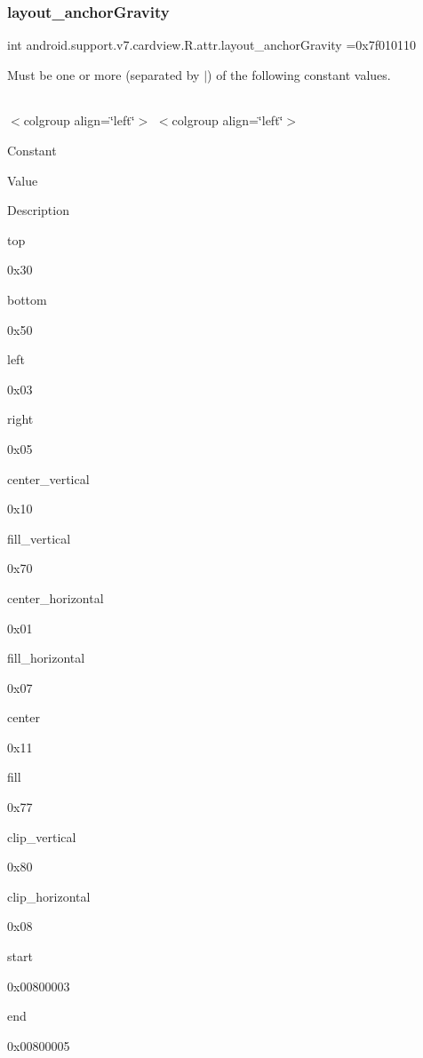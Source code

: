 \subsubsection{\texorpdfstring{layout\+\_\+anchor\+Gravity}{layout\_anchorGravity}}
{\footnotesize\ttfamily int android.\+support.\+v7.\+cardview.\+R.\+attr.\+layout\+\_\+anchor\+Gravity =0x7f010110\hspace{0.3cm}{\ttfamily [static]}}

Must be one or more (separated by \textquotesingle{}$\vert$\textquotesingle{}) of the following constant values.

\tabulinesep=1mm
\begin{longtabu} spread 0pt [c]{*{0}{|X[-1]}|}
\hline
\end{longtabu}
$<$colgroup align=\char`\"{}left\char`\"{}$>$ $<$colgroup align=\char`\"{}left\char`\"{}$>$ 

Constant

Value

Description 

{\ttfamily top}

0x30

{\ttfamily bottom}

0x50

{\ttfamily left}

0x03

{\ttfamily right}

0x05

{\ttfamily center\+\_\+vertical}

0x10

{\ttfamily fill\+\_\+vertical}

0x70

{\ttfamily center\+\_\+horizontal}

0x01

{\ttfamily fill\+\_\+horizontal}

0x07

{\ttfamily center}

0x11

{\ttfamily fill}

0x77

{\ttfamily clip\+\_\+vertical}

0x80

{\ttfamily clip\+\_\+horizontal}

0x08

{\ttfamily start}

0x00800003

{\ttfamily end}

0x00800005\mbox{\label{classandroid_1_1support_1_1v7_1_1cardview_1_1R_1_1attr_a407bbdce0d48daa5f8c2bf959a52d866}} 
